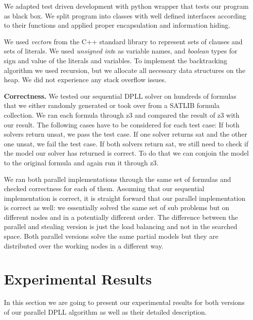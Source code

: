 \documentclass[letterpaper]{article}
\newcommand{\mypar}[1]{{\bf #1.}}
\begin{document}
We adapted test driven development with python wrapper that tests our program as black box.
We split program into classes with well defined interfaces according to their functions and applied proper encapsulation and information hiding.
\fi

We used \textit{vector}s from the C++ standard library to represent sets of clauses and sets of literals.
We used \textit{unsigned int}s as variable names, and \textit{boolean} types for sign and value of the literals and variables.
To implement the backtracking algorithm we used recursion, but we allocate all necessary data structures on the heap.
We did not experience any stack overflow issues.

\mypar{Correctness}
We tested our sequential DPLL solver on hundreds of formulas that we either randomly generated or took over from a SATLIB formula collection. \cite{cnf_website}
We ran each formula through z3 \cite{z3} and compared the result of z3 with our result.
The following cases have to be considered for each test case:
    If both solvers return unsat, we pass the test case.
    If one solver returns sat and the other one unsat, we fail the test case.
    If both solvers return sat, we still need to check if the model our solver has returned is correct.
        To do that we can conjoin the model to the original formula and again run it through z3.

We ran both parallel implementations through the same set of formulas and checked correctness for each of them.
Assuming that our sequential implementation is correct, it is straight forward that our parallel implementation is correct as well:
we essentially solved the same set of sub problems but on different nodes and in a potentially different order.
The difference between the parallel and stealing version is just the load balancing and not in the searched space.
Both parallel versions solve the same partial models but they are distributed over the working nodes in a different way.

\section{Experimental Results}\label{sec:exp}
In this section we are going to present our experimental results for both versions of our parallel DPLL algorithm as well as their detailed description.
\end{document}
